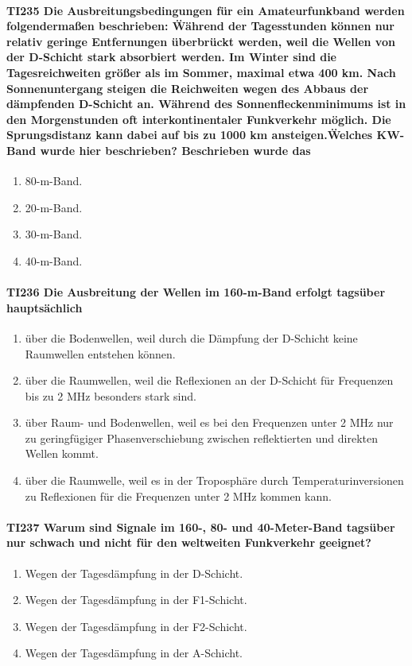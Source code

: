 \documentclass[8pt]{article}
\begin{document}
\paragraph*{TI235 Die Ausbreitungsbedingungen für ein Amateurfunkband werden folgendermaßen beschrieben: \"Während der Tagesstunden können nur relativ geringe Entfernungen überbrückt werden, weil die Wellen von der D-Schicht stark absorbiert werden. Im Winter sind die Tagesreichweiten größer als im Sommer, maximal etwa 400 km. Nach Sonnenuntergang steigen die Reichweiten wegen des Abbaus der dämpfenden D-Schicht an. Während des Sonnenfleckenminimums ist in den Morgenstunden oft interkontinentaler Funkverkehr möglich. Die Sprungsdistanz kann dabei auf bis zu 1000 km ansteigen.\" Welches KW-Band wurde hier beschrieben? Beschrieben wurde das}
\begin{enumerate}[nolistsep,label=\Alph*]
\item 80-m-Band.
\item 20-m-Band.
\item 30-m-Band.
\item 40-m-Band.
\end{enumerate}

\paragraph*{TI236 Die Ausbreitung der Wellen im 160-m-Band erfolgt tagsüber hauptsächlich} 
\begin{enumerate}[nolistsep,label=\Alph*]
\item über die Bodenwellen, weil durch die Dämpfung der D-Schicht keine Raumwellen entstehen können.
\item über die Raumwellen, weil die Reflexionen an der D-Schicht für Frequenzen bis zu 2 MHz besonders stark sind.
\item über Raum- und Bodenwellen, weil es bei den Frequenzen unter 2 MHz nur zu geringfügiger Phasenverschiebung zwischen reflektierten und direkten Wellen kommt.
\item über die Raumwelle, weil es in der Troposphäre durch Temperaturinversionen zu Reflexionen für die Frequenzen unter 2 MHz kommen kann.
\end{enumerate}

\paragraph*{TI237 Warum sind Signale im 160-, 80- und 40-Meter-Band tagsüber nur schwach und nicht für den weltweiten Funkverkehr geeignet?} 
\begin{enumerate}[nolistsep,label=\Alph*]
\item Wegen der Tagesdämpfung in der D-Schicht.
\item Wegen der Tagesdämpfung in der F1-Schicht.
\item Wegen der Tagesdämpfung in der F2-Schicht.
\item Wegen der Tagesdämpfung in der A-Schicht.
\end{enumerate}
\end{document}
